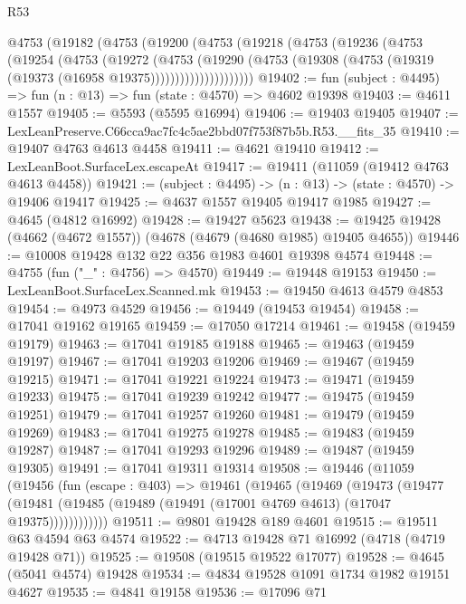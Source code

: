 \begin{lexlean}{R53}
\begin{coremodule}
      @4753
        (@19182
          (@4753
            (@19200
              (@4753
                (@19218
                  (@4753
                    (@19236
                      (@4753
                        (@19254
                          (@4753
                            (@19272
                              (@4753
                                (@19290
                                  (@4753
                                    (@19308
                                      (@4753 (@19319 (@19373 (@16958 @19375)))))))))))))))))))))
@19402 := fun (subject : @4495) => fun (n : @13) => fun (state : @4570) => @4602 @19398
@19403 := @4611 @1557
@19405 := @5593 (@5595 @16994)
@19406 := @19403 @19405
@19407 := LexLeanPreserve.C66cca9ac7fc4c5ae2bbd07f753f87b5b.R53.__fits_35
@19410 := @19407 @4763 @4613 @4458
@19411 := @4621 @19410
@19412 := LexLeanBoot.SurfaceLex.escapeAt
@19417 := @19411 (@11059 (@19412 @4763 @4613 @4458))
@19421 := (subject : @4495) -> (n : @13) -> (state : @4570) -> @19406 @19417
@19425 := @4637 @1557 @19405 @19417 @1985
@19427 := @4645 (@4812 @16992)
@19428 := @19427 @5623
@19438 := @19425 @19428 (@4662 (@4672 @1557)) (@4678 (@4679 (@4680 @1985) @19405 @4655))
@19446 := @10008 @19428 @132 @22 @356 @1983 @4601 @19398 @4574
@19448 := @4755 (fun ("_" : @4756) => @4570)
@19449 := @19448 @19153
@19450 := LexLeanBoot.SurfaceLex.Scanned.mk
@19453 := @19450 @4613 @4579 @4853
@19454 := @4973 @4529
@19456 := @19449 (@19453 @19454)
@19458 := @17041 @19162 @19165
@19459 := @17050 @17214
@19461 := @19458 (@19459 @19179)
@19463 := @17041 @19185 @19188
@19465 := @19463 (@19459 @19197)
@19467 := @17041 @19203 @19206
@19469 := @19467 (@19459 @19215)
@19471 := @17041 @19221 @19224
@19473 := @19471 (@19459 @19233)
@19475 := @17041 @19239 @19242
@19477 := @19475 (@19459 @19251)
@19479 := @17041 @19257 @19260
@19481 := @19479 (@19459 @19269)
@19483 := @17041 @19275 @19278
@19485 := @19483 (@19459 @19287)
@19487 := @17041 @19293 @19296
@19489 := @19487 (@19459 @19305)
@19491 := @17041 @19311 @19314
@19508 := @19446
    (@11059
      (@19456
        (fun (escape : @403) =>
        @19461
          (@19465
            (@19469
              (@19473
                (@19477
                  (@19481 (@19485 (@19489 (@19491 (@17001 @4769 @4613) (@17047 @19375))))))))))))
@19511 := @9801 @19428 @189 @4601
@19515 := @19511 @63 @4594 @63 @4574
@19522 := @4713 @19428 @71 @16992 (@4718 (@4719 @19428 @71))
@19525 := @19508 (@19515 @19522 @17077)
@19528 := @4645 (@5041 @4574) @19428
@19534 := @4834 @19528 @1091 @1734 @1982 @19151 @4627
@19535 := @4841 @19158
@19536 := @17096 @71

\end{coremodule}
\end{lexlean}
